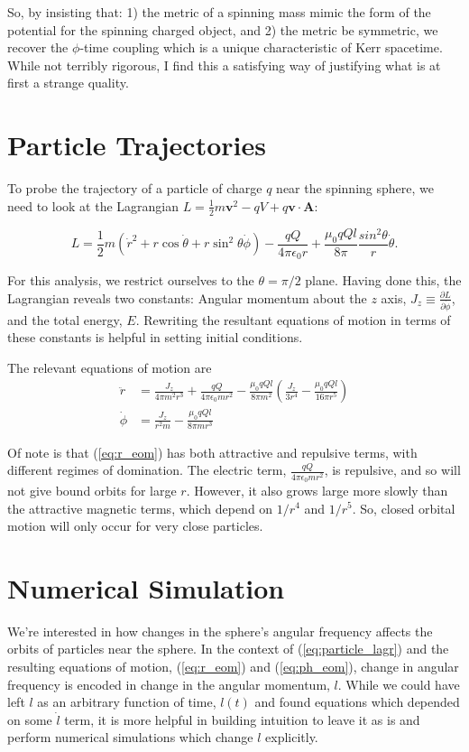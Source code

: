\documentclass[11pt]{article}
\begin{document}
So, by insisting that: 1) the metric of a spinning mass mimic the form of the potential for the spinning charged object, and 2) the metric be symmetric, we recover the $\phi$-time coupling which is a unique characteristic of Kerr spacetime.  While not terribly rigorous, I find this a satisfying way of justifying what is at first a strange quality.

\section{Particle Trajectories}
To probe the trajectory of a particle of charge $q$ near the spinning sphere, we need to look at the Lagrangian $L = \frac{1}{2}m\mathbf{v}^2 - qV + q\mathbf{v}\cdot\mathbf{A}$:

\begin{equation}\label{eq:particle_lagr}
L = \frac{1}{2}m\left(\dot{r}^2 + r\cos\dot{\theta} + r\sin^2\theta\dot{\phi}\right) - \frac{qQ}{4\pi\epsilon_0r} + \frac{\mu_0qQl}{8\pi}\frac{sin^2\theta}{r}\dot{\theta}.
\end{equation}
 
For this analysis, we restrict ourselves to the $\theta = \pi/2$ plane.  Having done this, the Lagrangian reveals two constants:  Angular momentum about the $z$ axis, $J_z \equiv \frac{\partial L}{\partial \dot{\phi}}$, and the total energy, $E$.  Rewriting the resultant equations of motion in terms of these constants is helpful in setting initial conditions.

The relevant equations of motion are
\begin{align}
\ddot{r} &= \frac{J_z}{4\pi m^2 r^3} + \frac{qQ}{4\pi\epsilon_0 m r^2} - \frac{\mu_0 q Q l}{8 \pi m^2}\left(\frac{J_z}{3r^4} - \frac{\mu_0 q Q l}{16\pi r^5}\right)\label{eq:r_eom}\\
\dot{\phi} &= \frac{J_z}{r^2m} - \frac{\mu_0qQl}{8\pi m r^3}\label{eq:ph_eom}
\end{align}

Of note is that (\ref{eq:r_eom}) has both attractive and repulsive terms, with different regimes of domination.  The electric term, $\frac{qQ}{4\pi\epsilon_0 m r^2}$, is repulsive, and so will not give bound orbits for large $r$.  However, it also grows large more slowly than the attractive magnetic terms, which depend on $1/r^4$ and $1/r^5$.  So, closed orbital motion will only occur for very close particles.

\section{Numerical Simulation}
We're interested in how changes in the sphere's angular frequency affects the orbits of particles near the sphere.  In the context of (\ref{eq:particle_lagr}) and the resulting equations of motion, (\ref{eq:r_eom}) and (\ref{eq:ph_eom}), change in angular frequency is encoded in change in the angular momentum, $l$.  While we could have left $l$ as an arbitrary function of time, $l(t)$ and found equations which depended on some $\dot{l}$ term, it is more helpful in building intuition to leave it as is and perform numerical simulations which change $l$ explicitly.
\end{document}

